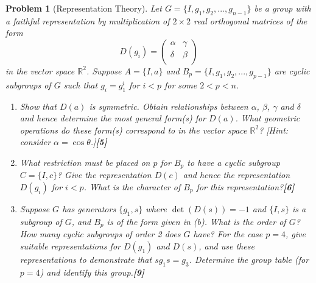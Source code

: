 \documentclass[a4paper]{article}
\theoremstyle{new}
\newtheorem{qns}{Problem}[section]
\begin{document}
\newpage
\begin{qns}[Representation Theory]
Let $G = \{I, g_1, g_2,..., g_{n−1}\}$ be a group with a faithful representation by multiplication of $2\times 2$ real orthogonal matrices of the form
$$D(g_i)=\begin{pmatrix}\alpha&\gamma\\\delta&\beta\\\end{pmatrix}$$
in the vector space $\mathbb{R}^2$. Suppose $A=\{I,a\}$ and $B_p=\{I,g_1,g_2,...,g_{p-1}\}$ are cyclic subgroups of $G$ such that $g_i=g^i_1$ for $i<p$ for some $2<p<n$.
\begin{enumerate}[label=(\alph*)]
\item Show that $D(a)$ is symmetric. Obtain relationships between $\alpha$, $\beta$, $\gamma$ and $\delta$ and hence determine the most general form(s) for $D(a)$. What geometric operations do these form(s) correspond to in the vector space $\mathbb{R}^2$? [Hint: consider $\alpha=\cos\theta$.]\hfill\textbf{[5]}
\item What restriction must be placed on $p$ for $B_p$ to have a cyclic subgroup $C = \{I, c\}$? Give the representation $D(c)$ and hence the representation $D(g_i)$ for $i < p$. What is the character of $B_p$ for this representation?\hfill\textbf{[6]}
\item Suppose $G$ has generators $\{g_1, s\}$ where $\det(D(s)) = −1$ and $\{I, s\}$ is a subgroup of $G$, and $B_p$ is of the form given in (b). What is the order of $G$? How many cyclic subgroups of order 2 does $G$ have? For the case $p = 4$, give suitable representations for $D(g_1)$ and $D(s)$, and use these representations to demonstrate that $sg_1s=g_3$. Determine the group table (for $p = 4$) and identify this group.\hfill\textbf{[9]}
\end{enumerate}
\end{qns}
\end{document}
